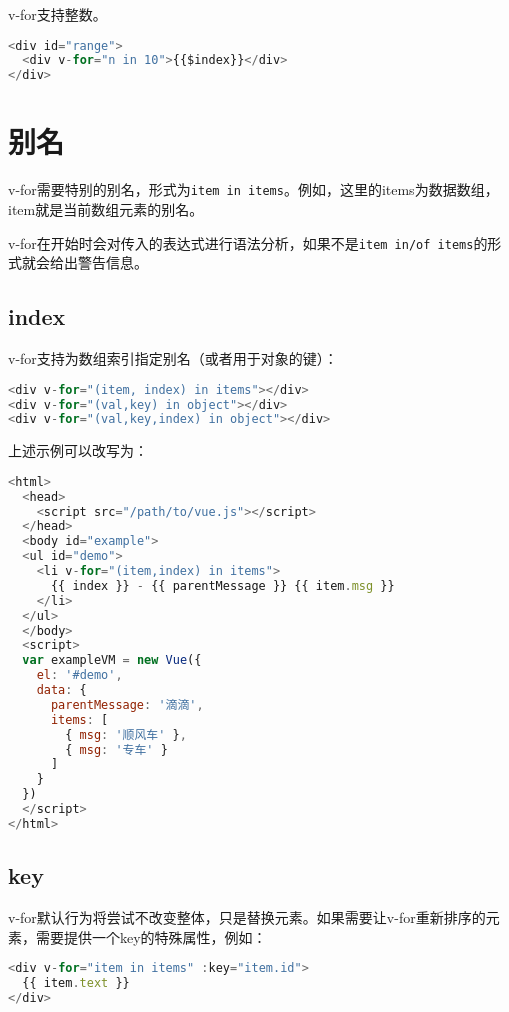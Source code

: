 v-for支持整数。


\begin{lstlisting}[language=JavaScript]
<div id="range">
  <div v-for="n in 10">{{$index}}</div>
</div>
\end{lstlisting}

\section{别名}

v-for需要特别的别名，形式为\texttt{item in items}。例如，这里的items为数据数组，item就是当前数组元素的别名。

v-for在开始时会对传入的表达式进行语法分析，如果不是\texttt{item in/of items}的形式就会给出警告信息。


\subsection{index}



v-for支持为数组索引指定别名（或者用于对象的键）：



\begin{lstlisting}[language=JavaScript]
<div v-for="(item, index) in items"></div>
<div v-for="(val,key) in object"></div>
<div v-for="(val,key,index) in object"></div>
\end{lstlisting}

上述示例可以改写为：


\begin{lstlisting}[language=JavaScript]
<html>
  <head>
    <script src="/path/to/vue.js"></script>
  </head>
  <body id="example">
  <ul id="demo">
    <li v-for="(item,index) in items">
      {{ index }} - {{ parentMessage }} {{ item.msg }}
    </li>
  </ul>
  </body>
  <script>
  var exampleVM = new Vue({
    el: '#demo',
    data: {
      parentMessage: '滴滴',
      items: [
        { msg: '顺风车' },
        { msg: '专车' }
      ]
    }
  })
  </script>
</html>
\end{lstlisting}

\subsection{key}


v-for默认行为将尝试不改变整体，只是替换元素。如果需要让v-for重新排序的元素，需要提供一个key的特殊属性，例如：


\begin{lstlisting}[language=JavaScript]
<div v-for="item in items" :key="item.id">
  {{ item.text }}
</div>
\end{lstlisting}



